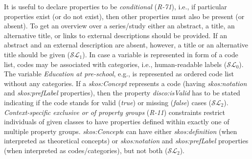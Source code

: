 \documentclass{llncs}
\newenvironment{DL}{
  \vspace{0cm}
	\begin{center}
  \begin{tabular}{c l}

}{
  \end{tabular}
	\end{center}
}
\begin{document}
{%
It is useful to declare properties to be \emph{conditional} (\emph{R-71}), i.e., if particular properties exist (or do not exist), then other properties must also be present (or absent).
To get an overview over a series/study either an abstract, a title, an alternative title, or links to external descriptions should be provided. 
If an abstract and an external description are absent, however,  
a title or an alternative title should be given ($\mathcal{SL}_{1}$).
In case a variable is represented in form of a code list, codes may be associated with categories, i.e., human-readable labels ($\mathcal{SL}_{0}$).
The variable \emph{Education at pre-school}, e.g., is represented as ordered code list without any categories.
If a {\em skos:Concept} represents a code (having {\em skos:notation} and {\em skos:prefLabel} properties), 
then the property {\em disco:isValid} has to be stated indicating if the code stands for valid (\emph{true}) or missing (\emph{false}) cases ($\mathcal{SL}_{2}$).
\emph{Context-specific exclusive or of property groups} (\emph{R-11}) constraints
restrict individuals of given classes to have properties defined within exactly one of multiple property groups.
\emph{skos:Concept}s can have either \emph{skos:definition} (when interpreted as theoretical concepts) or \emph{skos:notation} and \emph{skos:prefLabel} properties (when interpreted as codes/categories), but not both ($\mathcal{SL}_{2}$).



%
%

}
\end{document}
